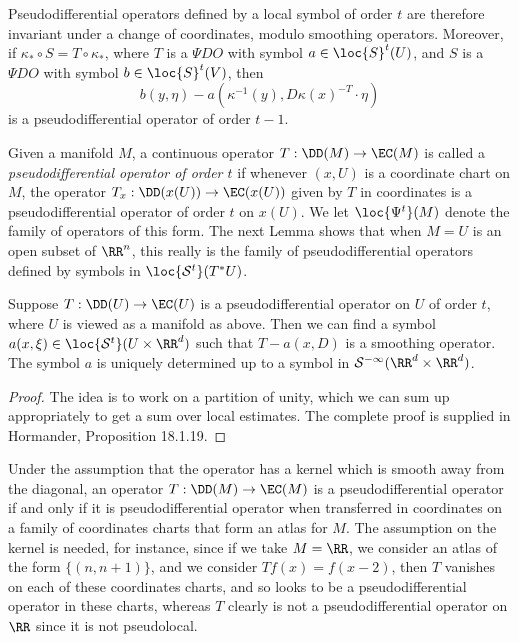 Pseudodifferential operators defined by a local symbol of order $t$ are therefore invariant under a change of coordinates, modulo smoothing operators. Moreover, if $\kappa_* \circ S = T \circ \kappa_*$, where $T$ is a $\Psi DO$ with symbol $a \in \loc{S}^t(U)$, and $S$ is a $\Psi DO$ with symbol $b \in \loc{S}^t(V)$, then
%
\[ b(y,\eta) - a(\kappa^{-1}(y), D\kappa(x)^{-T} \cdot \eta) \]
%
is a pseudodifferential operator of order $t - 1$.


Given a manifold $M$, a continuous operator $T: \DD(M) \to \EC(M)$ is called a \emph{pseudodifferential operator of order $t$} if whenever $(x,U)$ is a coordinate chart on $M$, the operator $T_x: \DD(x(U)) \to \EC(x(U))$ given by $T$ in coordinates is a pseudodifferential operator of order $t$ on $x(U)$. We let $\loc{\Psi^t}(M)$ denote the family of operators of this form. The next Lemma shows that when $M = U$ is an open subset of $\RR^n$, this really is the family of pseudodifferential operators defined by symbols in $\loc{\mathcal{S}^t}(T^* U)$.

\begin{lemma}
    Suppose $T: \DD(U) \to \EC(U)$ is a pseudodifferential operator on $U$ of order $t$, where $U$ is viewed as a manifold as above. Then we can find a symbol $a(x,\xi) \in \loc{\mathcal{S}^t}(U \times \RR^d)$ such that $T - a(x,D)$ is a smoothing operator. The symbol $a$ is uniquely determined up to a symbol in $\mathcal{S}^{-\infty}(\RR^d \times \RR^d)$.
\end{lemma}
\begin{proof}
    The idea is to work on a partition of unity, which we can sum up appropriately to get a sum over local estimates. The complete proof is supplied in Hormander, Proposition 18.1.19.
\end{proof}

\begin{remark}
    Under the assumption that the operator has a kernel which is smooth away from the diagonal, an operator $T: \DD(M) \to \EC(M)$ is a pseudodifferential operator if and only if it is pseudodifferential operator when transferred in coordinates on a family of coordinates charts that form an atlas for $M$. The assumption on the kernel is needed, for instance, since if we take $M = \RR$, we consider an atlas of the form $\{ (n, n+1) \}$, and we consider $Tf(x) = f(x - 2)$, then $T$ vanishes on each of these coordinates charts, and so looks to be a pseudodifferential operator in these charts, whereas $T$ clearly is not a pseudodifferential operator on $\RR$ since it is not pseudolocal.
\end{remark}

